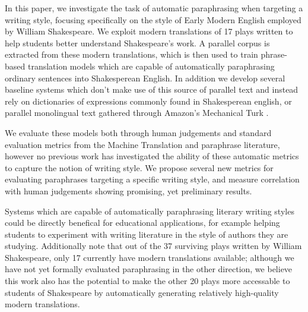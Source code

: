 \documentclass[10pt,a5paper,twoside]{article}
\begin{document}
In this paper, we investigate the task of automatic paraphrasing when targeting a writing style, focusing specifically on the style of Early Modern English employed by William Shakespeare.
We exploit modern translations of 17 plays written to help students better understand Shakespeare's work.  A parallel corpus is extracted from these modern translations,
which is then used to train phrase-based translation models which are capable of automatically paraphrasing ordinary sentences into Shakesperean English.  In addition we develop several
baseline systems which don't make use of this source of parallel text and instead rely on dictionaries of expressions commonly found in Shakesperean english, or parallel monolingual text
gathered through Amazon's Mechanical Turk \cite{chen11}.

We evaluate these models both through human judgements and standard evaluation metrics from the Machine Translation and paraphrase literature, however no previous work has investigated the ability of these automatic metrics
to capture the notion of writing style.  We propose several new metrics for evaluating paraphrases targeting a specific writing style, and measure correlation with human judgements showing  promising, yet
preliminary results.

Systems which are capable of automatically paraphrasing literary writing styles could be directly benefical for educational applications, for example helping students to experiment with writing literature in the
style of authors they are studying.  Additionally note that out of the 37 surviving plays written by William Shakespeare, only 17 currently have modern translations available; although we have not yet formally evaluated
paraphrasing in the other direction, we believe this work also has the potential to make the other 20 plays more accessable to students of Shakespeare by automatically generating relatively high-quality modern translations.

\end{document}
